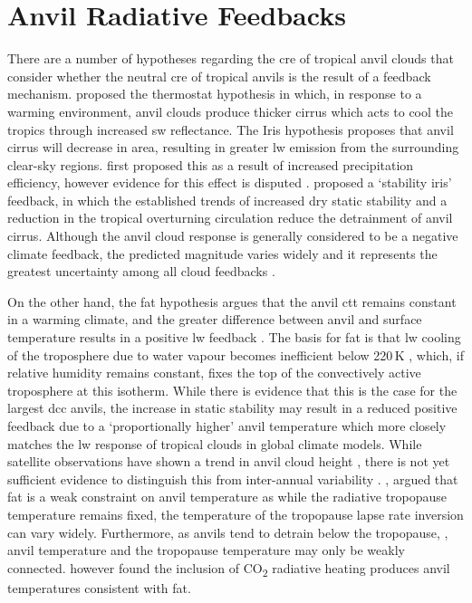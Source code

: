 \section{Anvil Radiative Feedbacks}

There are a number of hypotheses regarding the \acrshort{cre} of tropical anvil clouds that consider whether the neutral \acrshort{cre} of tropical anvils is the result of a feedback mechanism. 
\citet{ramanathan_cloud-radiative_1989} proposed the thermostat hypothesis in which, in response to a warming environment, anvil clouds produce thicker cirrus which acts to cool the tropics through increased \acrshort{sw} reflectance. 
The Iris hypothesis proposes that anvil cirrus will decrease in area, resulting in greater \acrshort{lw} emission from the surrounding clear-sky regions.
\citet{lindzen_does_2001} first proposed this as a result of increased precipitation efficiency, however evidence for this effect is disputed \citep{genio_climatic_2002, lin_examination_2004}.
\citet{bony_thermodynamic_2016} proposed a `stability iris' feedback, in which the established trends of increased dry static stability \citep{held_robust_2006} and a reduction in the tropical overturning circulation \citep{vecchi_global_2007} reduce the detrainment of anvil cirrus.
Although the anvil cloud response is generally considered to be a negative climate feedback, the predicted magnitude varies widely and it represents the greatest uncertainty among all cloud feedbacks \citep{sherwood_assessment_2020}.

On the other hand, the \acrfull{fat} hypothesis argues that the anvil \acrfull{ctt} remains constant in a warming climate, and the greater difference between anvil and surface temperature results in a positive \acrshort{lw} feedback \citep{hartmann_important_2002}.
The basis for \acrfull{fat} is that \acrshort{lw} cooling of the troposphere due to water vapour becomes inefficient below 220\,\unit{K} \citep{jeevanjee_simple_2020}, which, if relative humidity remains constant, fixes the top of the convectively active troposphere at this isotherm. 
While there is evidence that this is the case for the largest \acrshort{dcc} anvils, the increase in static stability may result in a reduced positive feedback due to a `proportionally higher' anvil temperature \citep{zelinka_why_2010} which more closely matches the \acrshort{lw} response of tropical clouds in global climate models.
While satellite observations have shown a trend in anvil cloud height \citep{norris_evidence_2016}, there is not yet sufficient evidence to distinguish this from inter-annual variability \citep{takahashi_when_2019}.
\citet{seeley_fat_2019}, argued that \acrshort{fat} is a weak constraint on anvil temperature as while the radiative tropopause temperature remains fixed, the temperature of the tropopause lapse rate inversion can vary widely. 
Furthermore, as anvils tend to detrain below the tropopause, \citep{takahashi_level_2017, wang_observational_2020}, anvil temperature and the tropopause temperature may only be weakly connected.
\citet{seidel_temperatures_2022} however found the inclusion of CO\textsubscript{2} radiative heating produces anvil temperatures consistent with \acrshort{fat}.

